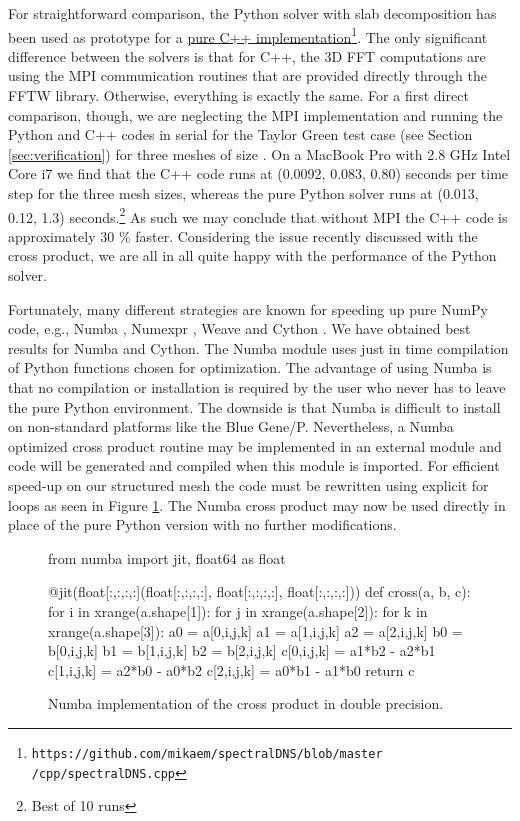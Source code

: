 \documentclass[final,3p,times,twocolumn]{elsarticle}
\begin{document}
For straightforward comparison, the Python solver with slab decomposition has been used as prototype for a
\href{https://github.com/mikaem/spectralDNS/blob/master/cpp/spectralDNS.cpp}{pure
 C++ 
implementation}\footnote{\texttt{https://github.com/mikaem/spectralDNS/blob/master
 /cpp/spectralDNS.cpp}}. The
only significant difference between the solvers is that for C++, the 3D FFT 
computations are using the MPI communication routines that are provided 
directly through the FFTW library. Otherwise, everything is exactly the same. 
For a first direct comparison, though, we are neglecting the MPI implementation 
and running the Python and C++ codes in serial for the Taylor Green test case 
(see Section \ref{sec:verification}) for three meshes of size . On a
MacBook Pro with 2.8 GHz Intel Core i7 we find that the C++ code runs at (0.0092, 0.083, 0.80) seconds per time step for the three mesh sizes, whereas the pure Python solver runs at (0.013, 0.12, 1.3) seconds.\footnote{Best of 10 runs} As such we may conclude that without MPI the C++ code is approximately 30 \% faster. Considering the issue recently discussed with the cross product, we are all in all quite happy with the performance of the Python solver.

Fortunately, many different strategies are known for speeding up pure 
NumPy code, e.g.,  Numba \cite{numba}, Numexpr \cite{numexpr}, Weave 
\cite{weave}
and Cython \cite{cython}. We have obtained best results for Numba 
and Cython. The {Numba} module uses just in time 
compilation of Python functions chosen for optimization. The advantage of using 
Numba is that no compilation or installation is required by the user 
who never has to leave the pure Python environment. The downside is that 
{Numba} is difficult to install on non-standard platforms like the Blue 
Gene/P. Nevertheless, a {Numba} optimized cross product routine may be 
implemented in an external module and code will be generated and 
compiled when this module is imported.  For efficient speed-up on our 
structured 
mesh the code must be rewritten using explicit for loops as seen in Figure 
\ref{fig:numba}. The {Numba} cross product may now be used directly in 
place of the pure Python version with no further modifications.
\begin{figure}
\begin{python}
from numba import jit, float64 as float

@jit(float[:,:,:,:](float[:,:,:,:], 
     float[:,:,:,:], float[:,:,:,:]))
def cross(a, b, c):
    for i in xrange(a.shape[1]):
        for j in xrange(a.shape[2]):
            for k in xrange(a.shape[3]):
                a0 = a[0,i,j,k]
                a1 = a[1,i,j,k]
                a2 = a[2,i,j,k]
                b0 = b[0,i,j,k]
                b1 = b[1,i,j,k]
                b2 = b[2,i,j,k]
                c[0,i,j,k] = a1*b2 - a2*b1
                c[1,i,j,k] = a2*b0 - a0*b2
                c[2,i,j,k] = a0*b1 - a1*b0
    return c
\end{python}
\caption{Numba implementation of the cross product in double 
precision.}\label{fig:numba}
\end{figure}
\end{document}
